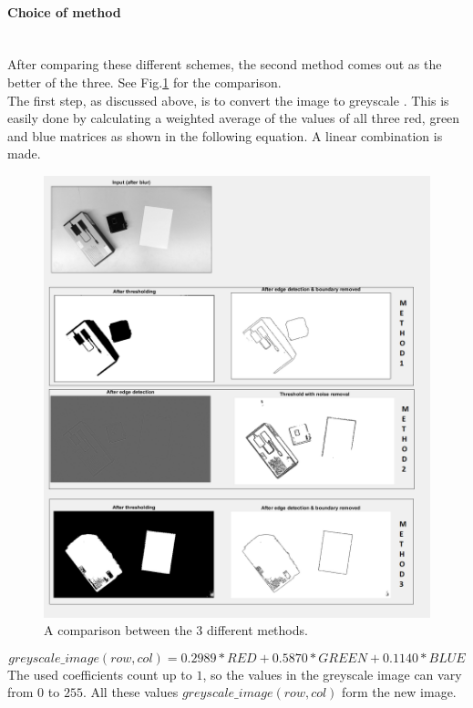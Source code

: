 \documentclass[11pt]{article}
\begin{document}
\paragraph{Choice of method}\mbox{}\\
After comparing these different schemes, the second method comes out as the better of the three. See Fig.\ref{fig:comparison_methods} for the comparison.\\
The first step, as discussed above, is to convert the image to greyscale \cite{greyscale}. This is easily done by calculating a weighted average of the values of all three red, green and blue matrices as shown in the following equation. A linear combination is made.
\begin{figure}[h]
	\center
  \includegraphics[width=0.7\linewidth]{comparison_methods.png}
  \caption{A comparison between the 3 different methods.}
  \label{fig:comparison_methods}
\end{figure}
\begin{equation}
greyscale\_image(row, col) = 0.2989 * RED + 0.5870 * GREEN + 0.1140 * BLUE
\end{equation}
The used coefficients count up to $1$, so the values in the greyscale image can vary from $0$ to $255$. All these values $greyscale\_image(row, col)$ form the new image.
\end{document}
